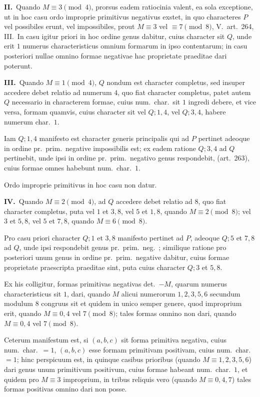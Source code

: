 \documentclass[12pt,a4paper]{article}
\theoremstyle{plain}
\theoremstyle{definition}
\theoremstyle{remark}
\begin{document}
\textbf{II.}\ Quando $M \equiv 3 \pmod{4}$, prorsus eadem ratiocinia valent, ea sola exceptione, ut in hoc casu ordo improprie primitivus negativus exstet, in quo characteres $P$ vel possibiles erunt, vel impossibiles, prout $M \equiv 3$ vel $\equiv 7 \pmod{8}$, V.\ art.\ 264, III.\ In casu igitur priori in hoc ordine genus dabitur, cuius character sit $Q$, unde erit $1$ numerus characteristicus omnium formarum in ipso contentarum; in casu posteriori nullae omnino formae negativae hac proprietate praeditae dari poterunt.

\textbf{III.}\ Quando $M \equiv 1 \pmod{4}$, $Q$ nondum est character completus, sed insuper accedere debet relatio ad numerum $4$, quo fiat character completus, patet autem $Q$ necessario in characterem formae, cuius num.\ char.\ sit $1$ ingredi debere, et vice versa, formam quamvis, cuius character sit vel $Q; 1, 4$, vel $Q; 3, 4$, habere numerum char.\ $1$.

Iam $Q; 1, 4$ manifesto est character generis principalis qui ad $P$ pertinet adeoque in ordine pr.\ prim.\ negative impossibilis est; ex eadem ratione $Q; 3, 4$ ad $Q$ pertinebit, unde ipsi in ordine pr.\ prim.\ negativo genus respondebit, (art.\ 263), cuius formae omnes habebunt num.\ char.\ $1$.

Ordo improprie primitivus in hoc casu non datur.

\textbf{IV.}\ Quando $M \equiv 2 \pmod{4}$, ad $Q$ accedere debet relatio ad $8$, quo fiat character completus, puta vel $1$ et $3, 8$, vel $5$ et $1, 8$, quando $M \equiv 2 \pmod{8}$; vel $3$ et $5, 8$, vel $5$ et $7, 8$, quando $M \equiv 6 \pmod{8}$.

Pro casu priori character $Q; 1$ et $3, 8$ manifesto pertinet ad $P$, adeoque $Q; 5$ et $7, 8$ ad $Q$, unde ipsi respondebit genus pr.\ prim.\ neg.\ ; similique ratione pro posteriori unum genus in ordine pr.\ prim.\ negative dabitur, cuius formae proprietate praescripta praeditae sint, puta cuius character $Q; 3$ et $5, 8$.

Ex his colligitur, formas primitivas negativas det.\ $-M$, quarum numerus characteristicus sit $1$, dari, quando $M$ alicui numerorum $1, 2, 3, 5, 6$ secundum modulum $8$ congruus sit et quidem in unico semper genere, quod improprium erit, quando $M \equiv 0, 4$ vel $7 \pmod{8}$; tales formas omnino non dari, quando $M \equiv 0, 4$ vel $7 \pmod{8}$.

Ceterum manifestum est, si $(a, b, c)$ sit forma primitiva negativa, cuius num.\ char.\ $= 1$, $(a, b, c)$ esse formam primitivam positivam, cuius num.\ char.\ $= 1$; hinc perspicuum est, in quinque casibus prioribus (quando $M \equiv 1, 2, 3, 5, 6$) dari genus unum primitivum positivum, cuius formae habeant num.\ char.\ $1$, et quidem pro $M \equiv 3$ improprium, in tribus reliquis vero (quando $M \equiv 0, 4, 7$) tales formas positivas omnino dari non posse.
\end{document}
